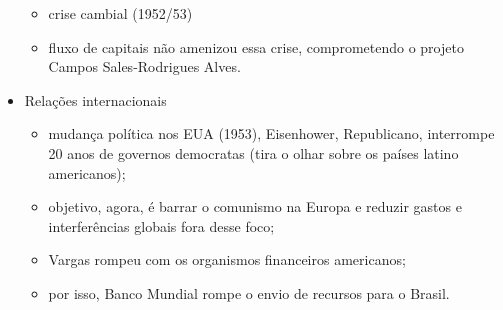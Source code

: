 \documentclass[a4paper,12pt]{article}[abntex2]
\begin{document}
\begin{itemize}
\begin{itemize}
        \item crise cambial (1952/53)
        \item fluxo de capitais não amenizou essa crise, comprometendo o projeto Campos Sales-Rodrigues Alves.
    \end{itemize}
    \item  Relações internacionais 
    \begin{itemize}
        \item mudança política nos EUA (1953), Eisenhower, Republicano, interrompe 20 anos de governos democratas (tira o olhar sobre os países latino americanos);
        \item objetivo, agora, é barrar o comunismo na Europa e reduzir gastos e interferências globais fora desse foco;
        \item Vargas rompeu com os organismos financeiros americanos;
        \item por isso, Banco Mundial rompe o envio de recursos para o Brasil.
    \end{itemize}
\end{itemize}
\end{document}
